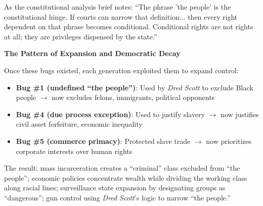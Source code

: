\documentclass[12pt,openany]{book}
\begin{document}
As the constitutional analysis brief notes: ``The phrase 'the people' is the constitutional hinge. If courts can narrow that definition... then every right dependent on that phrase becomes conditional. Conditional rights are not rights at all; they are privileges dispensed by the state.''

\textbf{The Pattern of Expansion and Democratic Decay}

Once these bugs existed, each generation exploited them to expand control:

\begin{itemize}
    \item \textbf{Bug \#1 (undefined ``the people'')}: Used by \textit{Dred Scott} to exclude Black people $\rightarrow$ now excludes felons, immigrants, political opponents
    \item \textbf{Bug \#4 (due process exception)}: Used to justify slavery $\rightarrow$ now justifies civil asset forfeiture, economic inequality
    \item \textbf{Bug \#5 (commerce primacy)}: Protected slave trade $\rightarrow$ now prioritizes corporate interests over human rights
\end{itemize}

The result: mass incarceration creates a ``criminal'' class excluded from ``the people''; economic policies concentrate wealth while dividing the working class along racial lines; surveillance state expansion by designating groups as ``dangerous''; gun control using \textit{Dred Scott}'s logic to narrow ``the people.''
\end{document}
